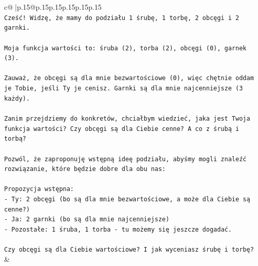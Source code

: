 \documentclass{article}
\begin{document}
{\begin{supertabular}{c@{$\;$}|p{.15\linewidth}@{}p{.15\linewidth}p{.15\linewidth}p{.15\linewidth}p{.15\linewidth}p{.15\linewidth}}
{{{\\ 
\texttt{Cześć! Widzę, że mamy do podziału 1 śrubę, 1 torbę, 2 obcęgi i 2 garnki.} \\
\\ 
\texttt{Moja funkcja wartości to: śruba (2), torba (2), obcęgi (0), garnek (3).} \\
\\ 
\texttt{Zauważ, że obcęgi są dla mnie bezwartościowe (0), więc chętnie oddam je Tobie, jeśli Ty je cenisz. Garnki są dla mnie najcenniejsze (3 każdy).} \\
\\ 
\texttt{Zanim przejdziemy do konkretów, chciałbym wiedzieć, jaka jest Twoja funkcja wartości? Czy obcęgi są dla Ciebie cenne? A co z śrubą i torbą?} \\
\\ 
\texttt{Pozwól, że zaproponuję wstępną ideę podziału, abyśmy mogli znaleźć rozwiązanie, które będzie dobre dla obu nas:} \\
\\ 
\texttt{Propozycja wstępna:} \\
\texttt{{-} Ty: 2 obcęgi (bo są dla mnie bezwartościowe, a może dla Ciebie są cenne?)} \\
\texttt{{-} Ja: 2 garnki (bo są dla mnie najcenniejsze)} \\
\texttt{{-} Pozostałe: 1 śruba, 1 torba {-} tu możemy się jeszcze dogadać.} \\
\\ 
\texttt{Czy obcęgi są dla Ciebie wartościowe? I jak wyceniasz śrubę i torbę?} \\
            }
        }
    }
    & \\ \\


\end{supertabular}}
\end{document}
